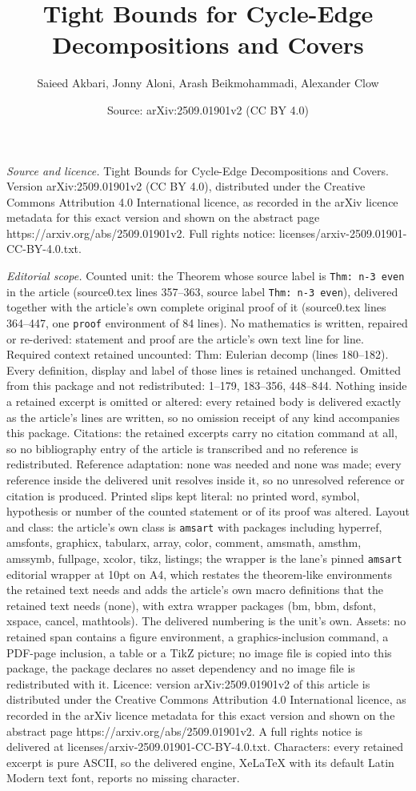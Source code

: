 \documentclass[10pt,a4paper]{amsart}
\title[Tight Bounds for Cycle-Edge Decompositions and Covers]{Tight Bounds for Cycle-Edge Decompositions and Covers}
\author{Saieed Akbari, Jonny Aloni, Arash Beikmohammadi, Alexander Clow}
\date{Source: arXiv:2509.01901v2 (CC BY 4.0)}
\begin{document}
\maketitle

\noindent\emph{Source and licence.} Tight Bounds for Cycle-Edge Decompositions and Covers. Version arXiv:2509.01901v2 (CC BY 4.0), distributed under the Creative Commons Attribution 4.0 International licence, as recorded in the arXiv licence metadata for this exact version and shown on the abstract page https://arxiv.org/abs/2509.01901v2. Full rights notice: licenses/arxiv-2509.01901-CC-BY-4.0.txt.\par\smallskip

\noindent\textit{Editorial scope.} Counted unit: the Theorem whose source label is \texttt{Thm: n-3 even} in the article (source0.tex lines 357--363, source label \texttt{Thm: n-3 even}), delivered together with the article's own complete original proof of it (source0.tex lines 364--447, one \texttt{proof} environment of 84 lines). No mathematics is written, repaired or re-derived: statement and proof are the article's own text line for line. Required context retained uncounted: Thm: Eulerian decomp (lines 180--182). Every definition, display and label of those lines is retained unchanged. Omitted from this package and not redistributed: 1--179, 183--356, 448--844. Nothing inside a retained excerpt is omitted or altered: every retained body is delivered exactly as the article's lines are written, so no omission receipt of any kind accompanies this package. Citations: the retained excerpts carry no citation command at all, so no bibliography entry of the article is transcribed and no reference is redistributed. Reference adaptation: none was needed and none was made; every reference inside the delivered unit resolves inside it, so no unresolved reference or citation is produced. Printed slips kept literal: no printed word, symbol, hypothesis or number of the counted statement or of its proof was altered. Layout and class: the article's own class is \texttt{amsart} with packages including hyperref, amsfonts, graphicx, tabularx, array, color, comment, amsmath, amsthm, amssymb, fullpage, xcolor, tikz, listings; the wrapper is the lane's pinned \texttt{amsart} editorial wrapper at 10pt on A4, which restates the theorem-like environments the retained text needs and adds the article's own macro definitions that the retained text needs (none), with extra wrapper packages (bm, bbm, dsfont, xspace, cancel, mathtools). The delivered numbering is the unit's own. Assets: no retained span contains a figure environment, a graphics-inclusion command, a PDF-page inclusion, a table or a TikZ picture; no image file is copied into this package, the package declares no asset dependency and no image file is redistributed with it. Licence: version arXiv:2509.01901v2 of this article is distributed under the Creative Commons Attribution 4.0 International licence, as recorded in the arXiv licence metadata for this exact version and shown on the abstract page https://arxiv.org/abs/2509.01901v2. A full rights notice is delivered at licenses/arxiv-2509.01901-CC-BY-4.0.txt. Characters: every retained excerpt is pure ASCII, so the delivered engine, XeLaTeX with its default Latin Modern text font, reports no missing character.
\end{document}
